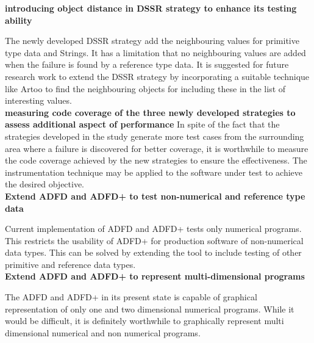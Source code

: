 \textbf{introducing object distance in DSSR strategy to enhance its testing ability}

The newly developed DSSR strategy add the neighbouring values for primitive type data and Strings. It has a limitation that no neighbouring values are added when the failure is found by  a reference type data. It is suggested for future research work to extend the DSSR strategy by incorporating a suitable technique like Artoo to find the neighbouring objects for including these in the list of interesting values.  \\


\textbf{measuring code coverage of the three newly developed strategies to assess additional aspect of performance}
In spite of the fact that the strategies developed in the study generate more test cases from the surrounding area where a failure is discovered for better coverage, it is worthwhile to measure the code coverage achieved by the new strategies to ensure the effectiveness. The instrumentation technique may be applied to the software under test to achieve the desired objective. \\

\textbf{Extend ADFD and ADFD+ to test non-numerical and reference type data}

Current implementation of ADFD and ADFD+ tests only numerical programs. This restricts the usability of ADFD+ for production software of non-numerical data types. This can be solved by extending the tool to include testing of other primitive and reference data types. \\

\textbf{Extend ADFD and ADFD+ to represent multi-dimensional programs}

The ADFD and ADFD+ in its present state is capable of graphical representation of only one and two dimensional numerical programs. While it would be difficult, it is definitely worthwhile to graphically represent multi dimensional numerical and non numerical programs.\\

